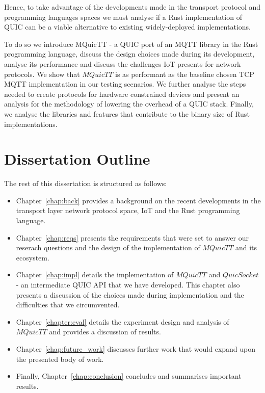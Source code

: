 Hence, to take advantage of the developments made in the transport protocol and programming languages spaces we must analyse if a Rust implementation of QUIC can be a viable alternative to existing widely-deployed implementations.

To do so we introduce MQuicTT - a QUIC port of an MQTT library in the Rust programming language, discuss the design choices made during its development, analyse its performance and discuss the challenges IoT presents for network protocols.
We show that $MQuicTT$ is as performant as the baseline chosen TCP MQTT implementation in our testing scenarios.
We further analyse the steps needed to create protocols for hardware constrained devices and present an analysis for the methodology of lowering the overhead of a QUIC stack.
Finally, we analyse the libraries and features that contribute to the binary size of Rust implementations.

\section{Dissertation Outline}

The rest of this dissertation is structured as follows:
\begin{itemize}
    \item Chapter~\ref{chap:back} provides a background on the recent developments in the transport layer network protocol space, IoT and the Rust programming language.
    \item Chapter~\ref{chap:reqs} presents the requirements that were set to answer our reserach questions and the design of the implementation of $MQuicTT$ and its ecosystem.
    \item Chapter~\ref{chap:impl} details the implementation of $MQuicTT$ and $QuicSocket$ - an intermediate QUIC API that we have developed. This chapter also presents a discussion of the choices made during implementation and the difficulties that we circumvented.
    \item Chapter~\ref{chapter:eval} details the experiment design and analysis of $MQuicTT$ and provides a discussion of results.
    \item Chapter~\ref{chap:future_work} discusses further work that would expand upon the presented body of work.
    \item Finally, Chapter~\ref{chap:conclusion} concludes and summarises important results.
\end{itemize}